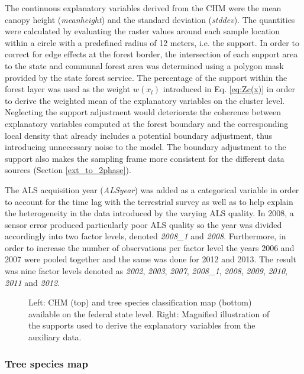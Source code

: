 \documentclass[remotesensing,article,submit,moreauthors,pdftex,10pt,a4paper]{mdpi}
\begin{document}
The continuous explanatory variables derived from the CHM were the mean canopy height (\textit{meanheight}) and the standard deviation (\textit{stddev}). The quantities were calculated by evaluating the raster values around each sample location within a circle with a predefined radius of 12 meters, i.e. the support. In order to correct for edge effects at the forest border, the intersection of each support area to the state and communal forest area was determined using a polygon mask provided by the state forest service. The percentage of the support within the forest layer was used as the weight $w(x_l)$ introduced in Eq. \ref{eq:Zc(x)} in order to derive the weighted mean of the explanatory variables on the cluster level. Neglecting the support adjustment would deteriorate the coherence between explanatory variables computed at the forest boundary and the corresponding local density that already includes a potential boundary adjustment, thus introducing unnecessary noise to the model. The boundary adjustment to the support also makes the sampling frame more consistent for the different data sources (Section \ref{ext_to_2phase}).\par
The ALS acquisition year (\textit{ALSyear}) was added as a categorical variable in order to account for the time lag with the terrestrial survey as well as to help explain the heterogeneity in the data introduced by the varying ALS quality. In 2008, a sensor error produced particularly poor ALS quality so the year was divided accordingly into two factor levels, denoted \textit{2008\_1} and \textit{2008}. Furthermore, in order to increase the number of observations per factor level the years 2006 and 2007 were pooled together and the same was done for 2012 and 2013.  The result was nine factor levels denoted as \textit{2002}, \textit{2003}, \textit{2007}, \textit{2008\_1}, \textit{2008}, \textit{2009}, \textit{2010}, \textit{2011} and \textit{2012}.

\begin{figure}[H]
	\centering
	\caption{Left: CHM (top) and tree species classification map (bottom) available on the federal state level. Right: Magnified illustration of the supports used to derive the explanatory variables from the auxiliary data.}
	\label{fig:Auxvars}
\end{figure}


\subsubsection{Tree species map}
\end{document}
